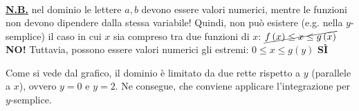 \documentclass[a4paper]{article}
\begin{document}
\begin{mdframed}
\begin{gather*}
		\end{gather*}
		\textbf{\underline{N.B.}} nel dominio le lettere $a,b$ devono essere valori numerici, mentre le funzioni non devono dipendere dalla stessa variabile! Quindi, non può esistere (e.g. nella $y$-semplice) il caso in cui $x$ sia compreso tra due funzioni di $x$: $\cancel{f\left(x\right) \le x \le g\left(x\right)}$ \textcolor{Red3}{\textbf{ NO! }}\newline
		Tuttavia, possono essere valori numerici gli estremi: $0 \le x \le g\left(y\right)$ \textcolor{Green4}{\textbf{ SÌ }}
	\end{mdframed}\newpage

	\noindent
	Come si vede dal grafico, il dominio è limitato da due rette rispetto a $y$ (parallele a $x$), ovvero $y = 0$ e $y = 2$. Ne consegue, che conviene applicare l'integrazione per $y$-semplice.\newline
\end{document}
